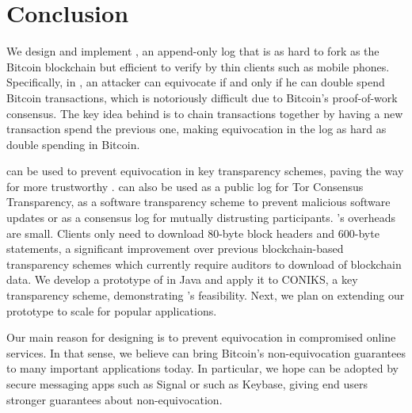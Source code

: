 \section{Conclusion}
\label{sec:conclusion}
We design and implement \Sys, an append-only log that is as hard to fork as the Bitcoin blockchain but efficient to verify by thin clients such as mobile phones.
Specifically, in \Sys, an attacker can equivocate if and only if he can double spend Bitcoin transactions, which is notoriously difficult due to Bitcoin's proof-of-work consensus.
The key idea behind \Sys is to chain \opret transactions together by having a new transaction spend the previous one, making equivocation in the log as hard as double spending in Bitcoin.

\Sys can be used to prevent equivocation in key transparency schemes, paving the way for more trustworthy \pkds.
\Sys can also be used as a public log for Tor Consensus Transparency\cite{tortransparency}, as a software transparency scheme to prevent malicious software updates or as a consensus log for mutually distrusting participants.
\Sys's overheads are small.
Clients only need to download 80-byte block headers and 600-byte statements, a significant improvement over previous blockchain-based transparency schemes\cite{keybase,virtualchain,blockstack} which currently require auditors to download \blockchainsize of blockchain data\cite{bitcoin-size}.
We develop a prototype of \Sys in Java and apply it to CONIKS, a key transparency scheme, demonstrating \Sys's feasibility.
Next, we plan on extending our prototype to scale for popular applications.

Our main reason for designing \Sys is to prevent equivocation in compromised online services.
In that sense, we believe \Sys can bring Bitcoin's non-equivocation guarantees to many important applications today.
In particular, we hope \Sys can be adopted by secure messaging apps such as Signal\cite{signal} or \pkds such as Keybase\cite{keybase}, giving end users stronger guarantees about non-equivocation.